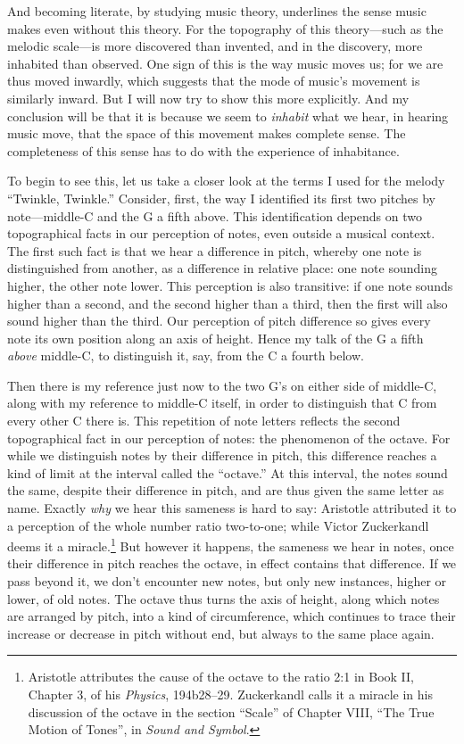 \documentclass[12pt]{memoir}
\begin{document}
And becoming literate, by studying music theory, underlines the sense
music makes even without this theory. For the topography of this
theory---such as the melodic scale---is more discovered than invented,
and in the discovery, more inhabited than observed. One sign of this is
the way music moves us; for we are thus moved inwardly, which suggests
that the mode of music's movement is similarly inward. But I will now
try to show this more explicitly. And my conclusion will be that it is
because we seem to \emph{inhabit} what we hear, in hearing music move,
that the space of this movement makes complete sense. The completeness
of this sense has to do with the experience of inhabitance.

To begin to see this, let us take a closer look at the terms I used for
the melody ``Twinkle, Twinkle.'' Consider, first, the way I identified
its first two pitches by note---middle-C and the G a fifth above. This
identification depends on two topographical facts in our perception of
notes, even outside a musical context. The first such fact is that we
hear a difference in pitch, whereby one note is distinguished from
another, as a difference in relative place: one note sounding higher,
the other note lower. This perception is also transitive: if one note
sounds higher than a second, and the second higher than a third, then
the first will also sound higher than the third. Our perception of pitch
difference so gives every note its own position along an axis of height.
Hence my talk of the G a fifth \emph{above} middle-C, to distinguish it,
say, from the C a fourth below.

Then there is my reference just now to the two G's on either side of
middle-C, along with my reference to middle-C itself, in order to
distinguish that C from every other C there is. This repetition of note
letters reflects the second topographical fact in our perception of
notes: the phenomenon of the octave. For while we distinguish notes by
their difference in pitch, this difference reaches a kind of limit at
the interval called the ``octave.'' At this interval, the notes sound
the same, despite their difference in pitch, and are thus given the same
letter as name. Exactly \emph{why} we hear this sameness is hard to say:
Aristotle attributed it to a perception of the whole number ratio
two-to-one; while Victor Zuckerkandl deems it a miracle.\footnote{Aristotle
  attributes the cause of the octave to the ratio 2:1 in Book II,
  Chapter 3, of his \emph{Physics}, 194b28--29. Zuckerkandl calls it a
  miracle in his discussion of the octave in the section ``Scale'' of
  Chapter VIII, ``The True Motion of Tones'', in \emph{Sound and
  Symbol}.} But however it happens, the sameness we hear in notes, once
their difference in pitch reaches the octave, in effect contains that
difference. If we pass beyond it, we don't encounter new notes, but only
new instances, higher or lower, of old notes. The octave thus turns the
axis of height, along which notes are arranged by pitch, into a kind of
circumference, which continues to trace their increase or decrease in
pitch without end, but always to the same place again.
\end{document}
